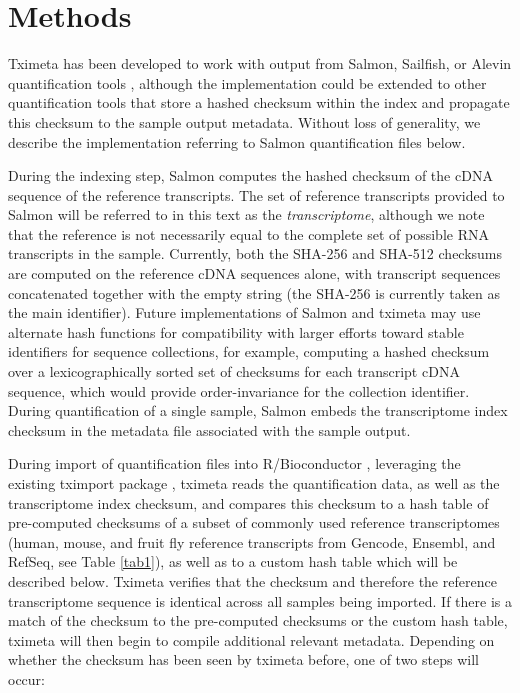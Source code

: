 \documentclass[12pt]{article} \usepackage[utf8]{inputenc}
\begin{document}
\section*{Methods}

Tximeta has been developed to work with output from Salmon, Sailfish,
or Alevin quantification tools \citep{sailfish,salmon,alevin},
although the implementation could be extended to other quantification
tools that store a hashed checksum within the index and propagate this
checksum to the sample output metadata. Without loss of generality, we
describe the implementation referring to Salmon quantification files
below.

During the indexing step, Salmon computes the hashed checksum of the
cDNA sequence of the reference transcripts. The set of reference
transcripts provided to Salmon will be referred to in this text as the
\textit{transcriptome}, although we note that the reference is not
necessarily equal to the complete set of possible RNA transcripts in
the sample. Currently, both the SHA-256 and SHA-512 \citep{sha1}
checksums are computed on the reference cDNA sequences alone, with
transcript sequences concatenated together with the empty string (the
SHA-256 is currently taken as the main identifier). Future
implementations of Salmon and tximeta may use alternate hash functions
for compatibility with larger efforts toward stable identifiers for
sequence collections, for example, computing a hashed checksum over a
lexicographically sorted set of checksums for each transcript cDNA
sequence, which would provide order-invariance for the collection
identifier. During quantification of a single sample, Salmon embeds
the transcriptome index checksum in the metadata file associated with
the sample output.

During import of quantification files into R/Bioconductor
\citep{bioc}, leveraging the existing tximport package
\citep{tximport}, tximeta reads the quantification data, as well as
the transcriptome index checksum, and compares this checksum to a hash
table of pre-computed checksums of a subset of commonly used reference
transcriptomes (human, mouse, and fruit fly reference transcripts from
Gencode, Ensembl, and RefSeq, see Table \ref{tab1}), as well as to a
custom hash table which will be described below. Tximeta verifies that
the checksum and therefore the reference transcriptome sequence is
identical across all samples being imported. If there is a match of
the checksum to the pre-computed checksums or the custom hash table,
tximeta will then begin to compile additional relevant
metadata. Depending on whether the checksum has been seen by tximeta
before, one of two steps will occur:
\end{document}
